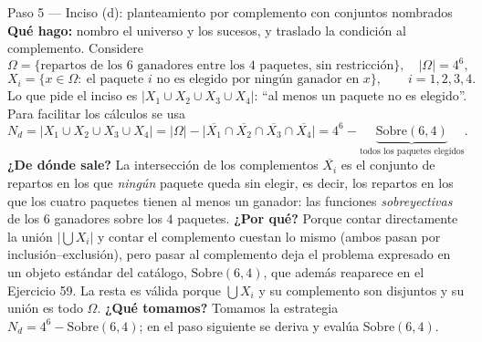 \documentclass[11pt]{article}
\begin{document}
\begin{sol}
\begin{paso}{Paso 5 --- Inciso (d): planteamiento por complemento con conjuntos nombrados}
\textbf{Qué hago:} nombro el universo y los sucesos, y traslado la condición al complemento. Considere
\[
\Omega=\{\text{repartos de los 6 ganadores entre los 4 paquetes, sin restricción}\},\quad |\Omega|=4^6,
\]
\[
X_i=\{x\in\Omega:\ \text{el paquete }i\text{ no es elegido por ningún ganador en }x\},\qquad i=1,2,3,4 .
\]
Lo que pide el inciso es $\bigl|X_1\cup X_2\cup X_3\cup X_4\bigr|$: ``al menos un paquete no es elegido''. Para facilitar los cálculos se usa
\[
N_d=\bigl|X_1\cup X_2\cup X_3\cup X_4\bigr|=|\Omega|-\bigl|\overline{X_1}\cap\overline{X_2}\cap\overline{X_3}\cap\overline{X_4}\bigr|
=4^6-\underbrace{\text{Sobre}(6,4)}_{\text{todos los paquetes elegidos}} .
\]
\textbf{¿De dónde sale?} La intersección de los complementos $\overline{X_i}$ es el conjunto de repartos en los que \emph{ningún} paquete queda sin elegir, es decir, los repartos en los que los cuatro paquetes tienen al menos un ganador: las funciones \emph{sobreyectivas} de los $6$ ganadores sobre los $4$ paquetes.
\textbf{¿Por qué?} Porque contar directamente la unión $\bigl|\bigcup X_i\bigr|$ y contar el complemento cuestan lo mismo (ambos pasan por inclusión--exclusión), pero pasar al complemento deja el problema expresado en un objeto estándar del catálogo, $\text{Sobre}(6,4)$, que además reaparece en el Ejercicio 59. La resta es válida porque $\bigcup X_i$ y su complemento son disjuntos y su unión es todo $\Omega$.
\textbf{¿Qué tomamos?} Tomamos la estrategia $N_d=4^6-\text{Sobre}(6,4)$; en el paso siguiente se deriva y evalúa $\text{Sobre}(6,4)$.
\end{paso}


\end{sol}
\end{document}
